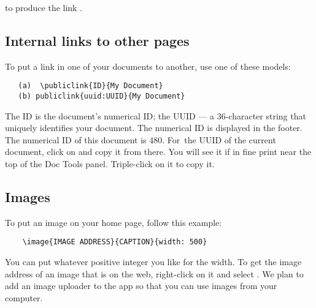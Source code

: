 to produce the link .


\subsection{Internal links to other pages} To put a link in one of your documents to another, use one of these models: 

\begin{verbatim}
   (a)  \publiclink{ID}{My Document}
   (b) publiclink{uuid:UUID}{My Document}
\end{verbatim}

The ID is the document's numerical ID; the UUID — a 36-character string that uniquely identifies your document.   The numerical ID is displayed in the footer.  The numerical ID of this document is 480.  For\ the UUID of the current document, click on  and copy it from there. You will see it if in fine print near the top of the  Doc Tools panel.  Triple-click on it to copy it.

\subsection{Images} To put an image on your home page, follow this example:

\begin{verbatim}
    \image{IMAGE ADDRESS}{CAPTION}{width: 500}
\end{verbatim}

You can put whatever positive integer you like for the width.  To get the image address of an image that is on the web, right-click on it and select .  We plan to add an image uploader to the app so that you can use images from your computer.

